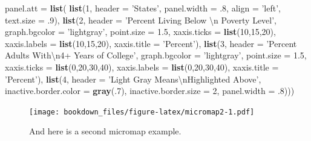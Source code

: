 \documentclass[
]{krantz}
\makeatletter
\newenvironment{Shaded}{\begin{snugshade}}{\end{snugshade}}
\newcommand{\CharTok}[1]{\textcolor[rgb]{0.5,0.5,0.5}{#1}}
\newcommand{\DataTypeTok}[1]{\textcolor[rgb]{0.27,0.27,0.27}{#1}}
\newcommand{\DecValTok}[1]{\textcolor[rgb]{0.06,0.06,0.06}{#1}}
\newcommand{\FloatTok}[1]{\textcolor[rgb]{0.06,0.06,0.06}{#1}}
\newcommand{\KeywordTok}[1]{\textcolor[rgb]{0.27,0.27,0.27}{\textbf{#1}}}
\newcommand{\NormalTok}[1]{#1}
\newcommand{\StringTok}[1]{\textcolor[rgb]{0.5,0.5,0.5}{#1}}
\newenvironment{kframe}{%
\medskip{}
\setlength{\fboxsep}{.8em}
 \def\at@end@of@kframe{}%
 \ifinner\ifhmode%
  \def\at@end@of@kframe{\end{minipage}}%
  \begin{minipage}{\columnwidth}%
 \fi\fi%
 \def\FrameCommand##1{\hskip\@totalleftmargin \hskip-\fboxsep
 \colorbox{shadecolor}{##1}\hskip-\fboxsep
     \hskip-\linewidth \hskip-\@totalleftmargin \hskip\columnwidth}%
 \MakeFramed {\advance\hsize-\width
   \@totalleftmargin\z@ \linewidth\hsize
   \@setminipage}}%
 {\par\unskip\endMakeFramed%
 \at@end@of@kframe}
\renewenvironment{Shaded}{\begin{kframe}}{\end{kframe}}
\makeatother
\begin{document}
\begin{Shaded}
\begin{Highlighting}[]
    \DataTypeTok{panel.att =} \KeywordTok{list}\NormalTok{(}
        \KeywordTok{list}\NormalTok{(}\DecValTok{1}\NormalTok{, }\DataTypeTok{header =} \StringTok{'States'}\NormalTok{, }\DataTypeTok{panel.width =} \FloatTok{.8}\NormalTok{, }\DataTypeTok{align =} \StringTok{'left'}\NormalTok{, }
          \DataTypeTok{text.size =} \FloatTok{.9}\NormalTok{),}
            \KeywordTok{list}\NormalTok{(}\DecValTok{2}\NormalTok{, }\DataTypeTok{header =} \StringTok{'Percent Living Below }\CharTok{\textbackslash{}n}\StringTok{ Poverty Level'}\NormalTok{,}
                \DataTypeTok{graph.bgcolor =} \StringTok{'lightgray'}\NormalTok{, }\DataTypeTok{point.size =} \FloatTok{1.5}\NormalTok{,}
                \DataTypeTok{xaxis.ticks =} \KeywordTok{list}\NormalTok{(}\DecValTok{10}\NormalTok{,}\DecValTok{15}\NormalTok{,}\DecValTok{20}\NormalTok{), }\DataTypeTok{xaxis.labels =} \KeywordTok{list}\NormalTok{(}\DecValTok{10}\NormalTok{,}\DecValTok{15}\NormalTok{,}\DecValTok{20}\NormalTok{),}
                \DataTypeTok{xaxis.title =} \StringTok{'Percent'}\NormalTok{),}
            \KeywordTok{list}\NormalTok{(}\DecValTok{3}\NormalTok{, }\DataTypeTok{header =} \StringTok{'Percent Adults With}\CharTok{\textbackslash{}n}\StringTok{4+ Years of College'}\NormalTok{,}
                \DataTypeTok{graph.bgcolor =} \StringTok{'lightgray'}\NormalTok{, }\DataTypeTok{point.size =} \FloatTok{1.5}\NormalTok{,}
                \DataTypeTok{xaxis.ticks =} \KeywordTok{list}\NormalTok{(}\DecValTok{0}\NormalTok{,}\DecValTok{20}\NormalTok{,}\DecValTok{30}\NormalTok{,}\DecValTok{40}\NormalTok{), }\DataTypeTok{xaxis.labels =} \KeywordTok{list}\NormalTok{(}\DecValTok{0}\NormalTok{,}\DecValTok{20}\NormalTok{,}\DecValTok{30}\NormalTok{,}\DecValTok{40}\NormalTok{),}
                \DataTypeTok{xaxis.title =} \StringTok{'Percent'}\NormalTok{),}
            \KeywordTok{list}\NormalTok{(}\DecValTok{4}\NormalTok{, }\DataTypeTok{header =} \StringTok{'Light Gray Means}\CharTok{\textbackslash{}n}\StringTok{Highlighted Above'}\NormalTok{,  }
                \DataTypeTok{inactive.border.color =} \KeywordTok{gray}\NormalTok{(.}\DecValTok{7}\NormalTok{), }\DataTypeTok{inactive.border.size =} \DecValTok{2}\NormalTok{, }
                \DataTypeTok{panel.width =} \FloatTok{.8}\NormalTok{)))}
\end{Highlighting}
\end{Shaded}

\begin{figure}
\centering
\texttt{[image: bookdown\_files/figure-latex/micromap2-1.pdf]}
\caption{\label{fig:micromap2}And here is a second micromap example.}
\end{figure}
\end{document}
